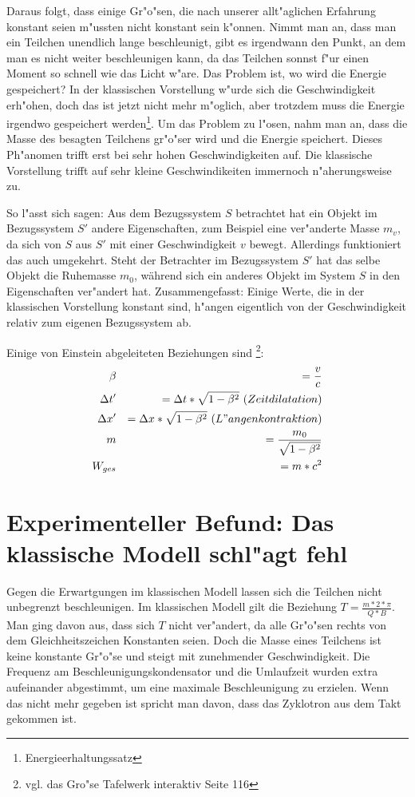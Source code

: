 \documentclass[14pt, a4paper]{report}
\begin{document}
Daraus folgt, dass einige Gr"o"sen, die nach unserer allt"aglichen Erfahrung konstant
seien m"ussten nicht konstant sein k"onnen. Nimmt man an, dass man ein Teilchen 
unendlich lange beschleunigt, gibt es irgendwann den Punkt, an dem man es nicht weiter
beschleunigen kann, da das Teilchen sonnst f"ur einen Moment so schnell wie das Licht 
w"are. Das Problem ist, wo wird die Energie gespeichert? In der klassischen Vorstellung 
w"urde sich die Geschwindigkeit erh"ohen, doch das ist jetzt nicht mehr m"oglich, aber 
trotzdem muss die Energie irgendwo gespeichert werden\footnote{Energieerhaltungssatz}. 
Um das Problem zu l"osen, nahm man an, dass die Masse des besagten Teilchens gr"o"ser 
wird und die Energie speichert. 
Dieses Ph"anomen trifft erst bei sehr hohen Geschwindigkeiten auf. Die klassische 
Vorstellung trifft auf sehr kleine Geschwindikeiten immernoch n"aherungsweise zu.

So l"asst sich sagen: Aus dem Bezugssystem $S$ betrachtet hat 
ein Objekt im Bezugssystem $S'$ andere Eigenschaften, zum Beispiel eine ver"anderte 
Masse $m_v$, da sich von $S$ aus $S'$ mit einer Geschwindigkeit $v$ bewegt. 
Allerdings funktioniert das auch umgekehrt. Steht der Betrachter im Bezugssystem $S'$ 
hat das selbe Objekt die Ruhemasse $m_0$, während sich ein anderes Objekt im System $S$ 
in den Eigenschaften ver"andert hat. Zusammengefasst: Einige Werte, die in der 
klassischen Vorstellung konstant sind, h"angen eigentlich von der Geschwindigkeit 
relativ zum eigenen Bezugssystem ab.

Einige von Einstein abgeleiteten Beziehungen sind 
\footnote{vgl. das Gro"se Tafelwerk interaktiv Seite 116 }:
\begin{eqnarray}
\beta && = \frac{v}{c} \\
\Delta t' && = \Delta t * \sqrt{1 - \beta^2} ~ (Zeitdilatation) \\
\Delta x' && = \Delta x * \sqrt{1 - \beta^2} ~ (L"angenkontraktion) \\
m && = \frac{m_0}{\sqrt{1 - \beta^2}} \label{var_m} \\
W_{ges} && = m * c^2 
\end{eqnarray}

\section{Experimenteller Befund: Das klassische Modell schl"agt fehl}
Gegen die Erwartgungen im klassischen Modell 
lassen sich die Teilchen nicht unbegrenzt beschleunigen. Im klassischen Modell
gilt die Beziehung $T = \frac{m * 2 * \pi }{Q * B}$.
Man ging davon aus, dass sich $T$ nicht ver"andert, da alle Gr"o"sen rechts von dem 
Gleichheitszeichen Konstanten seien. Doch die Masse eines Teilchens
ist keine konstante Gr"o"se  und steigt mit zunehmender 
Geschwindigkeit. Die Frequenz am Beschleunigungskondensator und die Umlaufzeit wurden
extra aufeinander abgestimmt, um eine maximale Beschleunigung zu erzielen. Wenn das 
nicht mehr gegeben ist spricht man davon, dass das Zyklotron aus dem Takt gekommen ist.
\end{document}
